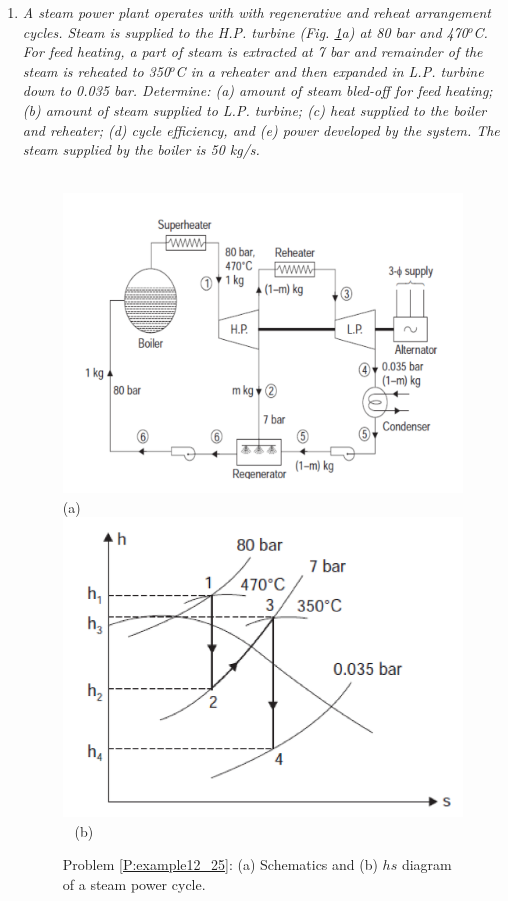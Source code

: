 \begin{enumerate}
\item\label{P:example12_25} {\it A steam power plant operates with with regenerative and reheat arrangement cycles. Steam is supplied to the H.P. turbine (Fig. \ref{example12_25}a) at 80 bar and 470$^{o}$C.  For feed heating, a part of steam is extracted at 7 bar and remainder of the steam is reheated to 350$^{o}$C in a reheater and then expanded in L.P. turbine down to 0.035 bar. Determine: (a) amount of steam bled-off for feed heating; (b) amount of steam supplied to L.P. turbine; (c) heat supplied to the boiler and reheater; (d) cycle efficiency, and (e) power developed by the system. The steam supplied by the boiler is 50 kg/s.}
   \begin{figure}[h]
    \begin{center}
    \vbox{
     \hbox{\hspace{1cm}
      \includegraphics[width=12.cm,clip]{./Pics/Exemple12_25a_Rajput}}
     \hbox{\hspace{7.5cm}(a)}
     \hbox{\hspace{1.cm}
      \includegraphics[width=12.cm,clip]{./Pics/Exemple12_25b_Rajput}
      }
     \hbox{\hspace{7.5cm}(b)}}
     \caption{Problem \ref{P:example12_25}: (a) Schematics and (b) $hs$ diagram of a steam power cycle.}
     \label{example12_25}
     \end{center}
   \end{figure}
 


\end{enumerate}
